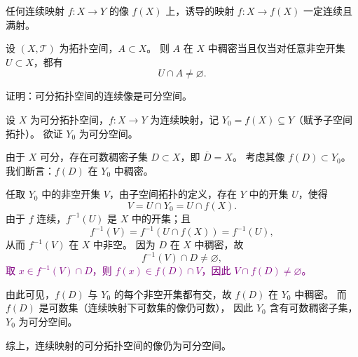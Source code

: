 \begin{dxtips}
    任何连续映射 $f:X\to Y$ 的像 $f(X)$ 上，诱导的映射 $f:X\to f(X)$ 一定连续且满射。
\end{dxtips}
\begin{proposition}[稠密子集的开集判定]
设 $(X,\mathcal{T})$ 为拓扑空间，$A\subset X$。  
则 $A$ 在 $X$ 中稠密当且仅当对任意非空开集 $U\subset X$，都有
\[
U\cap A \ne \varnothing.
\]
\end{proposition}
\begin{homework}[4]
证明：可分拓扑空间的连续像是可分空间。
\end{homework}
\begin{solution}
设 $X$ 为可分拓扑空间，$f:X\to Y$ 为连续映射，记 $Y_0=f(X)\subseteq Y$（赋予子空间拓扑）。  
欲证 $Y_0$ 为可分空间。

由于 $X$ 可分，存在可数稠密子集 $D\subset X$，即 $\overline{D}=X$。  
考虑其像 $f(D)\subset Y_0$。我们断言：$f(D)$ 在 $Y_0$ 中稠密。

任取 $Y_0$ 中的非空开集 $V$，由子空间拓扑的定义，存在 $Y$ 中的开集 $U$，使得
\[
V=U\cap Y_0=U\cap f(X).
\]
由于 $f$ 连续，$f^{-1}(U)$ 是 $X$ 中的开集；且
\[
f^{-1}(V)=f^{-1}(U\cap f(X))=f^{-1}(U),
\]
从而 $f^{-1}(V)$ 在 $X$ 中非空。  
因为 $D$ 在 $X$ 中稠密，故
\[
f^{-1}(V)\cap D\ne\varnothing,
\]
\textcolor{purple}{取 $x\in f^{-1}(V)\cap D$，则 $f(x)\in f(D)\cap V$，因此 $V\cap f(D)\ne\varnothing$。}

由此可见，$f(D)$ 与 $Y_0$ 的每个非空开集都有交，故 $f(D)$ 在 $Y_0$ 中稠密。  
而 $f(D)$ 是可数集（连续映射下可数集的像仍可数），  
因此 $Y_0$ 含有可数稠密子集，$Y_0$ 为可分空间。

综上，连续映射的可分拓扑空间的像仍为可分空间。
\end{solution}

